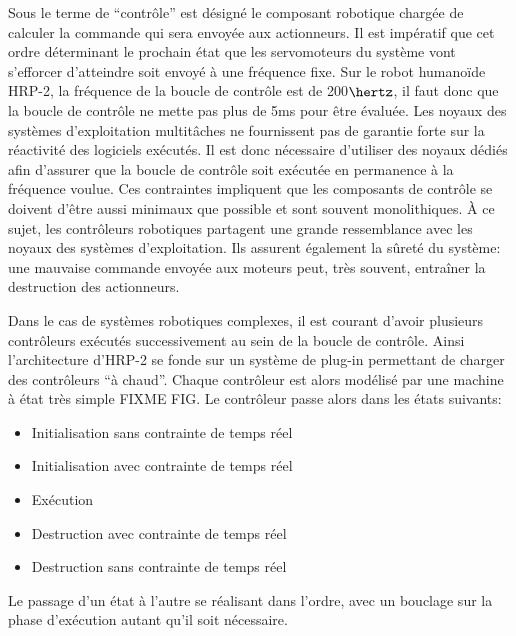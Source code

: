 Sous le terme de ``contrôle'' est désigné le composant robotique
chargée de calculer la commande qui sera envoyée aux actionneurs. Il
est impératif que cet ordre déterminant le prochain état que les
servomoteurs du système vont s'efforcer d'atteindre soit envoyé à une
fréquence fixe. Sur le robot humanoïde HRP-2, la fréquence de la
boucle de contrôle est de 200$\hertz$, il faut donc que la boucle de
contrôle ne mette pas plus de 5ms pour être évaluée. Les noyaux des
systèmes d'exploitation multitâches ne fournissent pas de garantie
forte sur la réactivité des logiciels exécutés. Il est donc nécessaire
d'utiliser des noyaux dédiés afin d'assurer que la boucle de contrôle
soit exécutée en permanence à la fréquence voulue. Ces contraintes
impliquent que les composants de contrôle se doivent d'être aussi
minimaux que possible et sont souvent monolithiques. À ce sujet, les
contrôleurs robotiques partagent une grande ressemblance avec les
noyaux des systèmes d'exploitation. Ils assurent également la sûreté
du système: une mauvaise commande envoyée aux moteurs peut, très
souvent, entraîner la destruction des actionneurs.

Dans le cas de systèmes robotiques complexes, il est courant d'avoir
plusieurs contrôleurs exécutés successivement au sein de la boucle de
contrôle. Ainsi l'architecture d'HRP-2 se fonde sur un système de
plug-in permettant de charger des contrôleurs ``à chaud''. Chaque
contrôleur est alors modélisé par une machine à état très simple FIXME
FIG. Le contrôleur passe alors dans les états suivants:

\begin{itemize}
\item Initialisation sans contrainte de temps réel
\item Initialisation avec contrainte de temps réel
\item Exécution
\item Destruction avec contrainte de temps réel
\item Destruction sans contrainte de temps réel
\end{itemize}

Le passage d'un état à l'autre se réalisant dans l'ordre, avec un
bouclage sur la phase d'exécution autant qu'il soit nécessaire.


